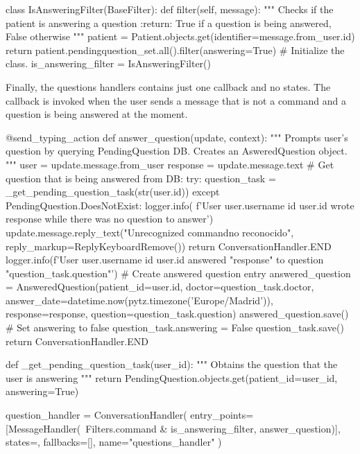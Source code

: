 \documentclass[12pt,english]{article}
\begin{document}
\begin{python}[caption={IsAnswering filter}, captionpos=b]
class IsAnsweringFilter(BaseFilter):
    def filter(self, message):
        """
        Checks if the patient is answering a question
        :return: True if a question is being answered, False otherwise
        """
        patient = Patient.objects.get(identifier=message.from_user.id)
        return patient.pendingquestion_set.all().filter(answering=True)
  # Initialize the class.
  is_answering_filter = IsAnsweringFilter()
\end{python}

Finally, the questions handlers contains just one callback and no states. The callback is invoked when the user sends a message that is not a command and a question is being answered at the moment.

\begin{python}[caption={Questions handler}, captionpos=b]
@send_typing_action
def answer_question(update, context):
    """
    Prompts user's question by querying PendingQuestion DB.
    Creates an AsweredQuestion object.
    """
    user = update.message.from_user
    response = update.message.text
    # Get question that is being answered from DB:
    try:
        question_task = _get_pending_question_task(str(user.id))
    except PendingQuestion.DoesNotExist:
        logger.info(
            f'User {user.username} id {user.id} wrote {response} while there was no question to answer')
        update.message.reply_text("Unrecognized command\nComando no reconocido", reply_markup=ReplyKeyboardRemove())
        return ConversationHandler.END
    logger.info(f'User {user.username} id {user.id} answered "{response}" to question "{question_task.question}"')
    # Create answered question entry
    answered_question = AnsweredQuestion(patient_id=user.id, doctor=question_task.doctor, answer_date=datetime.now(pytz.timezone('Europe/Madrid')), response=response, question=question_task.question)
    answered_question.save()
    # Set answering to false
    question_task.answering = False
    question_task.save()
    return ConversationHandler.END

def _get_pending_question_task(user_id):
    """
    Obtains the question that the user is answering
    """
    return PendingQuestion.objects.get(patient_id=user_id, answering=True)

question_handler = ConversationHandler(
    entry_points=[MessageHandler(~Filters.command & is_answering_filter, answer_question)],
    states={},
    fallbacks=[],
    name="questions_handler"
)
\end{python}
\end{document}
